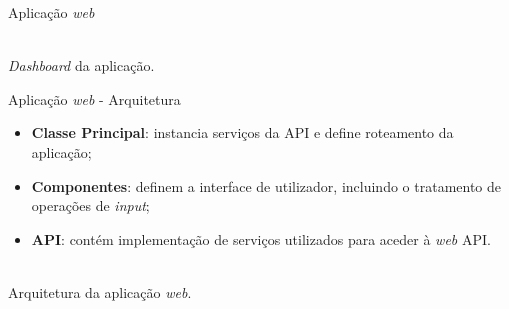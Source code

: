 \begin{frame}{Aplicação \textit{web}}

\vspace*{-2em}

\centering
{}\\

{\small \textit{Dashboard} da aplicação.}

\end{frame}

\begin{frame}{Aplicação \textit{web} - Arquitetura}
	
\vspace*{-3em}
	
\begin{itemize}
	\item \textbf{Classe Principal}: instancia serviços da API e define roteamento da aplicação;
	\item \textbf{Componentes}: definem a interface de utilizador, incluindo o tratamento de operações de \textit{input};
	\item \textbf{API}: contém implementação de serviços utilizados para aceder à \textit{web} API.
\end{itemize}		

\centering
{}\\

{\small Arquitetura da aplicação \textit{web}.}

\end{frame}